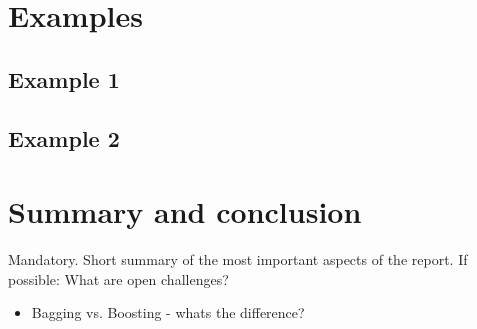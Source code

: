 \section{Examples}
\subsection{Example 1}
\subsection{Example 2}

\section{Summary and conclusion}
Mandatory. Short summary of the most important aspects of the report.
If possible: What are open challenges?

\begin{itemize}
    \item Bagging vs. Boosting - whats the difference?
\end{itemize}


